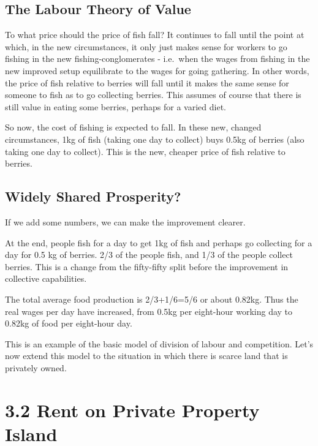 \documentclass[]{tufte-handout}
\begin{document}
\hypertarget{the-labour-theory-of-value}{%
\subsection{The Labour Theory of
Value}\label{the-labour-theory-of-value}}

To what price should the price of fish fall? It continues to fall until
the point at which, in the new circumstances, it only just makes sense
for workers to go fishing in the new fishing-conglomerates - i.e.~when
the wages from fishing in the new improved setup equilibrate to the
wages for going gathering. In other words, the price of fish relative to
berries will fall until it makes the same sense for someone to fish as
to go collecting berries. This assumes of course that there is still
value in eating some berries, perhaps for a varied diet.

So now, the cost of fishing is expected to fall. In these new, changed
circumstances, 1kg of fish (taking one day to collect) buys 0.5kg of
berries (also taking one day to collect). This is the new, cheaper price
of fish relative to berries.

\hypertarget{widely-shared-prosperity}{%
\subsection{Widely Shared Prosperity?}\label{widely-shared-prosperity}}

If we add some numbers, we can make the improvement clearer.

At the end, people fish for a day to get 1kg of fish and perhaps go
collecting for a day for 0.5 kg of berries. 2/3 of the people fish, and
1/3 of the people collect berries. This is a change from the fifty-fifty
split before the improvement in collective capabilities.

The total average food production is 2/3+1/6=5/6 or about 0.82kg. Thus
the real wages per day have increased, from 0.5kg per eight-hour working
day to 0.82kg of food per eight-hour day.

This is an example of the basic model of division of labour and
competition. Let's now extend this model to the situation in which there
is scarce land that is privately owned.

\hypertarget{rent-on-private-property-island}{%
\section{3.2 Rent on Private Property
Island}\label{rent-on-private-property-island}}
\end{document}
